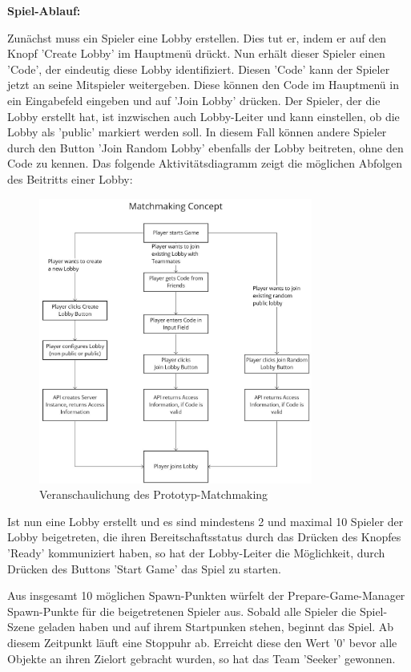 \textbf{Spiel-Ablauf:}

Zunächst muss ein Spieler eine Lobby erstellen. Dies tut er, indem er auf den Knopf 'Create Lobby' im Hauptmenü drückt. Nun erhält dieser Spieler einen 'Code', der eindeutig diese Lobby identifiziert. Diesen 'Code' kann der Spieler jetzt an seine Mitspieler weitergeben. Diese können den Code im Hauptmenü in ein Eingabefeld eingeben und auf 'Join Lobby' drücken. Der Spieler, der die Lobby erstellt hat, ist inzwischen auch Lobby-Leiter und kann einstellen, ob die Lobby als 'public' markiert werden soll. In diesem Fall können andere Spieler durch den Button 'Join Random Lobby' ebenfalls der Lobby beitreten, ohne den Code zu kennen. Das folgende Aktivitätsdiagramm zeigt die möglichen Abfolgen des Beitritts einer Lobby:

\begin{figure}[H]
	\centering
	\includegraphics[width=90mm]{images/matchmaking_concept.jpg}
	\caption[Matchmaking-Konzept Diagramm]{Veranschaulichung des Prototyp-Matchmaking}
	\label{pic:matchmaking_concept}
\end{figure}

Ist nun eine Lobby erstellt und es sind mindestens 2 und maximal 10 Spieler der Lobby beigetreten, die ihren Bereitschaftsstatus durch das Drücken des Knopfes 'Ready' kommuniziert haben, so hat der Lobby-Leiter die Möglichkeit, durch Drücken des Buttons 'Start Game' das Spiel zu starten.

Aus insgesamt 10 möglichen Spawn-Punkten würfelt der Prepare-Game-Manager Spawn-Punkte für die beigetretenen Spieler aus. Sobald alle Spieler die Spiel-Szene geladen haben und auf ihrem Startpunken stehen, beginnt das Spiel. Ab diesem Zeitpunkt läuft eine Stoppuhr ab. Erreicht diese den Wert '0' bevor alle Objekte an ihren Zielort gebracht wurden, so hat das Team 'Seeker' gewonnen.

